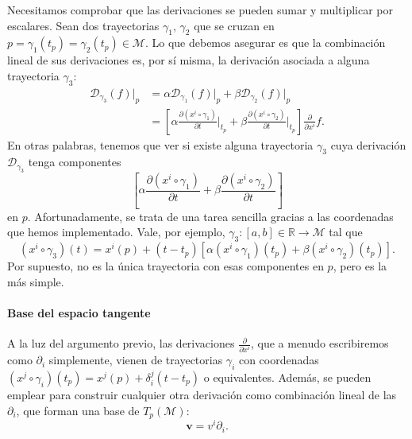 Necesitamos comprobar que las derivaciones se pueden sumar y multiplicar por escalares. Sean dos trayectorias \(\gamma_1\), \(\gamma_2\) que se cruzan en \(p=\gamma_1(t_p) = \gamma_2(t_p)\in\mathcal{M}\). Lo que debemos asegurar es que la combinación lineal de sus derivaciones es, por sí misma, la derivación asociada a alguna trayectoria \(\gamma_3\):
\begin{align}
    \nonumber
    \mathcal{D}_{\gamma_3}(f)\big|_p &= \alpha \mathcal{D}_{\gamma_1}(f)\big|_p + \beta \mathcal{D}_{\gamma_2}(f)\big|_p \\
    &= \left[\alpha \frac{\partial \left(x^i\circ\gamma_1\right)}{\partial t}\Big|_{t_p} + \beta \frac{\partial \left(x^i\circ\gamma_2\right)}{\partial t}\Big|_{t_p} \right] \frac{\partial }{\partial x^i} f.
\end{align}
En otras palabras, tenemos que ver si existe alguna trayectoria \(\gamma_3\) cuya derivación \(\mathcal{D}_{\gamma_3}\) tenga componentes 
\begin{equation*}
    \left[\alpha \frac{\partial \left(x^i\circ\gamma_1\right)}{\partial t} + \beta \frac{\partial \left(x^i\circ\gamma_2\right)}{\partial t} \right]
\end{equation*}
en \(p\). Afortunadamente, se trata de una tarea sencilla gracias a las coordenadas que hemos implementado. Vale, por ejemplo, \(\gamma_3:[a, b]\in\mathbb{R}\rightarrow\mathcal{M}\) tal que  
\begin{equation}
    \left(x^i\circ\gamma_3\right)(t) = x^i(p) + (t-t_p)\left[\alpha\left(x^i\circ\gamma_1\right)(t_p) + \beta\left(x^i\circ\gamma_2\right)(t_p)\right].
\end{equation}
Por supuesto, no es la única trayectoria con esas componentes en \(p\), pero es la más simple. 

\paragraph{Base del espacio tangente} A la luz del argumento previo, las derivaciones \(\frac{\partial}{\partial x^i}\), que a menudo escribiremos como \(\partial_i\) simplemente, vienen de trayectorias \(\gamma_i\) con coordenadas \((x^j\circ\gamma_i)(t_p) = x^j(p) + \delta^j_i (t-t_p)\) o equivalentes. Además, se pueden emplear para construir cualquier otra derivación como combinación lineal de las \(\partial_i\), que forman una base de \(T_p(\mathcal{M})\):
\begin{equation}
    \mathbf{v} = v^i\partial_i.
\end{equation}

